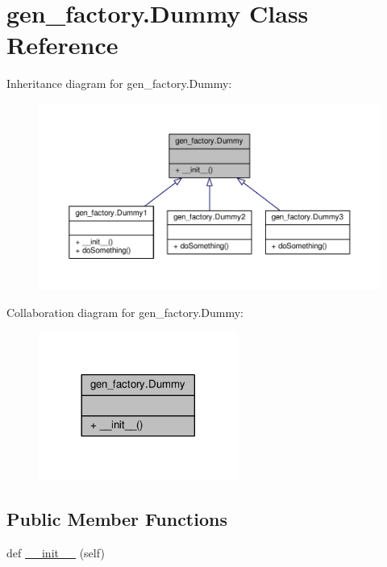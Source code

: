 \hypertarget{classgen__factory_1_1_dummy}{}\section{gen\+\_\+factory.\+Dummy Class Reference}
\label{classgen__factory_1_1_dummy}


Inheritance diagram for gen\+\_\+factory.\+Dummy\+:\nopagebreak
\begin{figure}[H]
\begin{center}
\leavevmode
\includegraphics[width=350pt]{classgen__factory_1_1_dummy__inherit__graph}
\end{center}
\end{figure}


Collaboration diagram for gen\+\_\+factory.\+Dummy\+:\nopagebreak
\begin{figure}[H]
\begin{center}
\leavevmode
\includegraphics[width=185pt]{classgen__factory_1_1_dummy__coll__graph}
\end{center}
\end{figure}
\subsection*{Public Member Functions}
\begin{DoxyCompactItemize}
\item 
def \hyperlink{classgen__factory_1_1_dummy_aed8c66d829aedd98a5b1bed80725ffab}{\+\_\+\+\_\+init\+\_\+\+\_\+} (self)
\end{DoxyCompactItemize}


